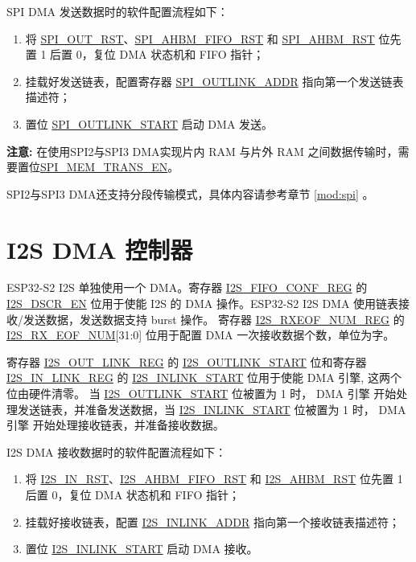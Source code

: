 \documentclass[main\_\_CN.tex]{subfiles}
\begin{document}
SPI DMA 发送数据时的软件配置流程如下：
\begin{enumerate}
    \item 将 \hyperref[fielddesc:SPIOUTRST]{SPI\_OUT\_RST}、\hyperref[fielddesc:SPIAHBMFIFORST]{SPI\_AHBM\_FIFO\_RST} 和 \hyperref[fielddesc:SPIAHBMRST]{SPI\_AHBM\_RST} 位先置 1 后置 0，复位 DMA 状态机和 FIFO 指针；
    \item 挂载好发送链表，配置寄存器 \hyperref[fielddesc:SPIOUTLINKADDR]{SPI\_OUTLINK\_ADDR} 指向第一个发送链表描述符；
    \item 置位 \hyperref[fielddesc:SPIOUTLINKSTART]{SPI\_OUTLINK\_START} 启动 DMA 发送。
\end{enumerate}

{\bfseries 注意: }在使用SPI2与SPI3 DMA实现片内 RAM 与片外 RAM 之间数据传输时，需要置位\hyperref[fielddesc:SPIMEMTRANSEN]{SPI\_MEM\_TRANS\_EN}。


SPI2与SPI3 DMA还支持分段传输模式，具体内容请参考章节 \ref{mod:spi} \textit{}。

\section{I2S DMA 控制器}

ESP32-S2 I2S 单独使用一个 DMA。寄存器 \hyperref[regdesc:I2SFIFOCONFREG]{I2S\_FIFO\_CONF\_REG} 的 \hyperref[fielddesc:I2SDSCREN]{I2S\_DSCR\_EN} 位用于使能 I2S 的 DMA 操作。ESP32-S2 I2S DMA 使用链表接收/发送数据，发送数据支持 burst 操作。 寄存器 \hyperref[regdesc:I2SRXEOFNUMREG]{I2S\_RXEOF\_NUM\_REG} 的 \hyperref[fielddesc:I2SRXEOFNUM]{I2S\_RX\_EOF\_NUM}[31:0] 位用于配置 DMA 一次接收数据个数，单位为字。

寄存器 \hyperref[regdesc:I2SOUTLINKREG]{I2S\_OUT\_LINK\_REG} 的 \hyperref[fielddesc:I2SOUTLINKSTART]{I2S\_OUTLINK\_START} 位和寄存器 \hyperref[regdesc:I2SINLINKREG]{I2S\_IN\_LINK\_REG} 的
\hyperref[fielddesc:I2SINLINKSTART]{I2S\_INLINK\_START} 位用于使能 DMA 引擎, 这两个位由硬件清零。 当 \hyperref[fielddesc:I2SOUTLINKSTART]{I2S\_OUTLINK\_START} 位被置为 1 时， DMA 引擎 开始处理发送链表，并准备发送数据，当 \hyperref[fielddesc:I2SINLINKSTART]{I2S\_INLINK\_START} 位被置为 1 时， DMA 引擎 开始处理接收链表，并准备接收数据。

I2S DMA 接收数据时的软件配置流程如下：
\begin{enumerate}
   \item 将 \hyperref[fielddesc:I2SINRST]{I2S\_IN\_RST}、\hyperref[fielddesc:I2SAHBMFIFORST]{I2S\_AHBM\_FIFO\_RST} 和 \hyperref[fielddesc:I2SAHBMRST]{I2S\_AHBM\_RST} 位先置 1 后置 0，复位 DMA 状态机和 FIFO 指针；
   \item 挂载好接收链表，配置 \hyperref[fielddesc:I2SINLINKADDR]{I2S\_INLINK\_ADDR} 指向第一个接收链表描述符；
   \item 置位 \hyperref[fielddesc:I2SINLINKSTART]{I2S\_INLINK\_START} 启动 DMA 接收。
\end{enumerate}
\end{document}

